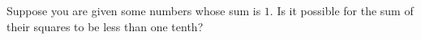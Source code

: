 Suppose you are given some numbers whose sum is $1$. Is it possible for the sum of their squares to be less than  one tenth?
